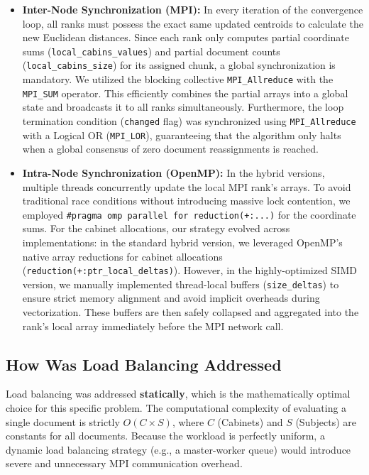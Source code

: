 \documentclass[12pt,a4paper]{article}
\begin{document}
\begin{itemize}
    \item \textbf{Inter-Node Synchronization (MPI):} In every iteration of the convergence loop, all ranks must possess the exact same updated centroids to calculate the new Euclidean distances. Since each rank only computes partial coordinate sums (\texttt{local\_cabins\_values}) and partial document counts (\texttt{local\_cabins\_size}) for its assigned chunk, a global synchronization is mandatory. We utilized the blocking collective \texttt{MPI\_Allreduce} with the \texttt{MPI\_SUM} operator. This efficiently combines the partial arrays into a global state and broadcasts it to all ranks simultaneously. Furthermore, the loop termination condition (\texttt{changed} flag) was synchronized using \texttt{MPI\_Allreduce} with a Logical OR (\texttt{MPI\_LOR}), guaranteeing that the algorithm only halts when a global consensus of zero document reassignments is reached.
    
    \item \textbf{Intra-Node Synchronization (OpenMP):} In the hybrid versions, multiple threads concurrently update the local MPI rank's arrays. To avoid traditional race conditions without introducing massive lock contention, we employed \texttt{\#pragma omp parallel for reduction(+:...)} for the coordinate sums. For the cabinet allocations, our strategy evolved across implementations: in the standard hybrid version, we leveraged OpenMP's native array reductions for cabinet allocations (\texttt{reduction(+:ptr\_local\_deltas)}). However, in the highly-optimized SIMD version, we manually implemented thread-local buffers (\texttt{size\_deltas}) to ensure strict memory alignment and avoid implicit overheads during vectorization. These buffers are then safely collapsed and aggregated into the rank's local array immediately before the MPI network call.
\end{itemize}

\subsection{How Was Load Balancing Addressed}
Load balancing was addressed \textbf{statically}, which is the mathematically optimal choice for this specific problem. The computational complexity of evaluating a single document is strictly $O(C \times S)$, where $C$ (Cabinets) and $S$ (Subjects) are constants for all documents. Because the workload is perfectly uniform, a dynamic load balancing strategy (e.g., a master-worker queue) would introduce severe and unnecessary MPI communication overhead.
\end{document}
